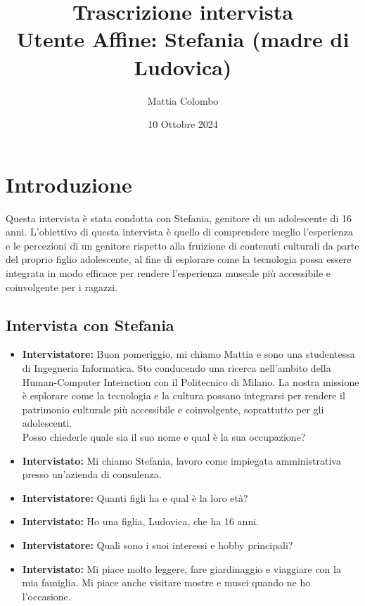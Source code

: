 \documentclass{article}
\title{\textbf{Trascrizione intervista}\\ Utente Affine: Stefania (madre di Ludovica)}
\author{Mattia Colombo}
\date{10 Ottobre 2024}
\begin{document}
\maketitle

\section{Introduzione}
Questa intervista è stata condotta con Stefania, genitore di un adolescente di 16 anni.
L'obiettivo di questa intervista è quello di comprendere meglio l'esperienza e le percezioni di un genitore rispetto alla fruizione di contenuti culturali da parte del proprio figlio adolescente, al fine di esplorare come la tecnologia possa essere integrata in modo efficace per rendere l’esperienza museale più accessibile e coinvolgente per i ragazzi.

\subsection{\textcolor{subsectioncolor}{Intervista con Stefania}}



\begin{itemize}
\item \textbf{Intervistatore:} Buon pomeriggio, mi chiamo Mattia e sono una studentessa di Ingegneria Informatica. Sto conducendo una ricerca nell’ambito della Human-Computer Interaction con il Politecnico di Milano. La nostra missione è esplorare come la tecnologia e la cultura possano integrarsi per rendere il patrimonio culturale più accessibile e coinvolgente, soprattutto per gli adolescenti.\\
    Posso chiederle quale sia il suo nome e qual è la sua occupazione?
    \item \textbf{Intervistato:} Mi chiamo Stefania, lavoro come impiegata amministrativa presso un’azienda di consulenza.
    
    \item \textbf{Intervistatore:} Quanti figli ha e qual è la loro età?
    \item \textbf{Intervistato:} Ho una figlia, Ludovica, che ha 16 anni.
    
    \item \textbf{Intervistatore:} Quali sono i suoi interessi e hobby principali?
    \item \textbf{Intervistato:} Mi piace molto leggere, fare giardinaggio e viaggiare con la mia famiglia. Mi piace anche visitare mostre e musei quando ne ho l’occasione.
\end{itemize}
\end{document}
